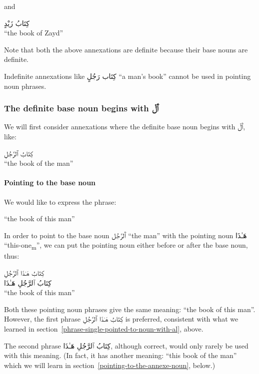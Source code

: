 \documentclass[
  10pt,
]{book}
\begin{document}
and

\foreignlanguage{arabic}{کِتَابُ زَيْدٍ}\\
\enquote{the book of Zayd}

Note that both the above annexations are definite because their base nouns are definite.

Indefinite annexations like
\foreignlanguage{arabic}{کِتَاب رَجُلٍ} \enquote{a man's book}
cannot be used in pointing noun phrases.

\subsubsection{\texorpdfstring{The definite base noun begins with \foreignlanguage{arabic}{ٱَلْ}}{The definite base noun begins with ٱَلْ}}\label{the-definite-base-noun-begins-with-ux671ux644}

We will first consider annexations where the definite base noun begins with \foreignlanguage{arabic}{ٱَلْ}, like:

\foreignlanguage{arabic}{کِتَابُ ٱلرَّجُلِ}\\
\enquote{the book of the man}

\paragraph{Pointing to the base noun}\label{pointing-to-the-base-noun}

We would like to express the phrase:

\enquote{the book of this man}

In order to point to the base noun \foreignlanguage{arabic}{ٱَلرَّجُل} \enquote{the man} with the pointing noun \foreignlanguage{arabic}{هَـٰذَا} \enquote{this-one\textsubscript{m}}, we can put the pointing noun either before or after the base noun, thus:

\foreignlanguage{arabic}{کِتَابُ هَـٰذَا ٱلرَّجُلِ}\\
\foreignlanguage{arabic}{کِتَابُ ٱلرَّجُلِ هَـٰذَا}\\
\enquote{the book of this man}

Both these pointing noun phrases give the same meaning: \enquote{the book of this man}.
However, the first phrase
\foreignlanguage{arabic}{کِتَابُ هَـٰذَا ٱلرَّجُلِ}
is preferred, consistent with what we learned in
section~\ref{phrase-single-pointed-to-noun-with-al}, above.

The second phrase
\foreignlanguage{arabic}{کِتَابُ ٱلرَّجُلِ هَـٰذَا},
although correct, would only rarely be used with this meaning.
(In fact, it has another meaning: \enquote{this book of the man} which we will learn in
section~\ref{pointing-to-the-annexe-noun}, below.)
\end{document}
